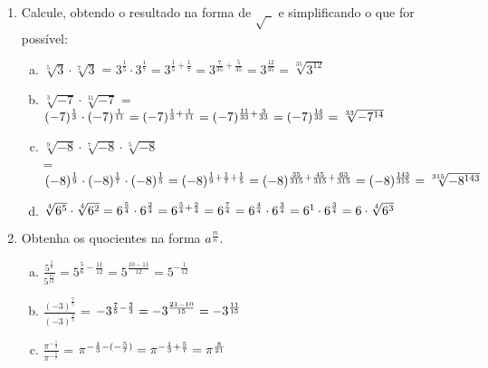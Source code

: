 \documentclass[a4paper,14pt]{article}
\begin{document}
\begin{multicols}{2}
\begin{enumerate}
\begin{enumerate}[a)]
        \end{enumerate}
        \item Calcule, obtendo o resultado na forma de $\sqrt{~~}$ e simplificando o que for possível:
        \begin{enumerate}[a)]
        	\item $\sqrt[5]{3} \cdot \sqrt[7]{3}$ = $3^\frac{1}{5} \cdot 3^\frac{1}{7} = 3^{\frac{1}{5} + \frac{1}{7}} = 3^{\frac{7}{35} + \frac{5}{35}} = 3^\frac{12}{35} = \sqrt[35]{3^{12}}$\\
        	\item $\sqrt[3]{-7} \cdot \sqrt[11]{-7}$ = $(-7)^\frac{1}{3} \cdot (-7)^\frac{1}{11} \\= (-7)^{\frac{1}{3} + \frac{1}{11}} = (-7)^{\frac{11}{33} + \frac{3}{33}} \\= (-7)^\frac{14}{33} = \sqrt[33]{-7^{14}}$ \\
        	\item $\sqrt[9]{-8} \cdot \sqrt[7]{-8} \cdot \sqrt[5]{-8}$ \\= $(-8)^\frac{1}{9} \cdot (-8)^\frac{1}{7} \cdot (-8)^\frac{1}{5} \\= (-8)^{\frac{1}{9} + \frac{1}{7} + \frac{1}{5}} \\= (-8)^{\frac{35}{315} + \frac{45}{315} + \frac{63}{315}} \\= (-8)^\frac{143}{315} = \sqrt[315]{-8^{143}}$ \\
        	\item $\sqrt[4]{6^5} \cdot \sqrt[4]{6^2} = 6^\frac{5}{4} \cdot 6^\frac{2}{4} = 6^{\frac{5}{4} + \frac{2}{4}} \\= 6^\frac{7}{4} = 6^\frac{4}{4} \cdot 6^\frac{3}{4} = 6^1 \cdot 6^\frac{3}{4} = 6 \cdot \sqrt[4]{6^3}$
        \end{enumerate}
        \item Obtenha os quocientes na forma $a^\frac{m}{n}$.
        \begin{enumerate}[a)]
        	\item $\frac{5^\frac{5}{6}}{5^\frac{11}{12}} = 5^{\frac{5}{6} - \frac{11}{12}} = 5^\frac{10 - 11}{12} = 5^{-\frac{1}{12}}$\\
        	\item $\frac{(-3)^\frac{7}{5}}{(-3)^\frac{2}{3}}$ = $-3^{\frac{7}{5} - \frac{2}{3}} = -3^{\frac{21-10}{15}} \\= -3^\frac{11}{15}$\\
        	\item $\frac{\pi^{-\frac{1}{3}}}{\pi^{-\frac{5}{7}}}$ = $\pi^{-\frac{1}{3} - (-\frac{5}{7})} = \pi^{-\frac{1}{3} + \frac{5}{7}} \\= \pi^\frac{8}{21}$\\

\end{enumerate}
\end{enumerate}
\end{multicols}
\end{document}
